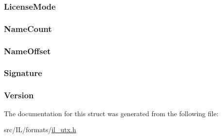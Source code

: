 \hypertarget{struct_u_t_x_h_e_a_d_e_r_a96213c0c7f0c9d41d026a75bb1fc65cf}{
\subsubsection[{License\-Mode}]{ License\-Mode}}\label{struct_u_t_x_h_e_a_d_e_r_a96213c0c7f0c9d41d026a75bb1fc65cf}
\hypertarget{struct_u_t_x_h_e_a_d_e_r_af2ca7fab3e564d18e72ba7620d125dc6}{
\subsubsection[{Name\-Count}]{ Name\-Count}}\label{struct_u_t_x_h_e_a_d_e_r_af2ca7fab3e564d18e72ba7620d125dc6}
\hypertarget{struct_u_t_x_h_e_a_d_e_r_a68070734d575788cdf666da6ac1e8187}{
\subsubsection[{Name\-Offset}]{ Name\-Offset}}\label{struct_u_t_x_h_e_a_d_e_r_a68070734d575788cdf666da6ac1e8187}
\hypertarget{struct_u_t_x_h_e_a_d_e_r_a41fa9091b239c168dd116f1c2cd99256}{
\subsubsection[{Signature}]{ Signature}}\label{struct_u_t_x_h_e_a_d_e_r_a41fa9091b239c168dd116f1c2cd99256}
\hypertarget{struct_u_t_x_h_e_a_d_e_r_a3824b470c86baa88d6ac31a3719e9f9a}{
\subsubsection[{Version}]{ Version}}\label{struct_u_t_x_h_e_a_d_e_r_a3824b470c86baa88d6ac31a3719e9f9a}


The documentation for this struct was generated from the following file\-:\begin{DoxyCompactItemize}
\item 
src/\-I\-L/formats/\hyperlink{il__utx_8h}{il\-\_\-utx.\-h}\end{DoxyCompactItemize}
